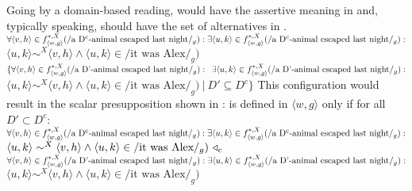 Going by a domain-based reading,  would have the assertive meaning in  and, typically speaking, should have the set of alternatives in .
\pex
\a {}\\$\forall{\langle v,h\rangle\in f^{*,X}_{\langle w,g\rangle}(/\text{a D\textsuperscript{c}-animal escaped last night}/_g)}:\\\exists\langle u,k\rangle\in f^{*,X}_{\langle w,g\rangle}(/\text{a D\textsuperscript{c}-animal escaped last night}/_g):$\\\emptyfill$\langle u,k\rangle\sim^X\langle v,h\rangle\land\langle u,k\rangle\in/\text{it was Alex}/_g)$
\a {}\\$\{\forall{\langle v,h\rangle\in f^{*,X}_{\langle w,g\rangle}(/\text{a D'-animal escaped last night}/_g)}:\\\phantom{\{}\exists\langle u,k\rangle\in f^{*,X}_{\langle w,g\rangle}(/\text{a D'-animal escaped last night}/_g):$\\\emptyfill$\langle u,k\rangle\sim^X\langle v,h\rangle\land\langle u,k\rangle\in/\text{it was Alex}/_g)~|~D'\subseteq D^c\}$
\xe
This configuration would result in the scalar presupposition shown in :
\ex
{}\linebreak
is defined in $\langle w,g\rangle$ only if for all $D'\subset D^c$:\\
$\forall{\langle v,h\rangle\in f^{*,X}_{\langle w,g\rangle}(/\text{a D\textsuperscript{c}-animal escaped last night}/_g)}:\\\exists\langle u,k\rangle\in f^{*,X}_{\langle w,g\rangle}(/\text{a D\textsuperscript{c}-animal escaped last night}/_g):$\\\emptyfill$\langle u,k\rangle\sim^X\langle v,h\rangle\land\langle u,k\rangle\in/\text{it was Alex}/_g)~\triangleleft_c$\\
$\forall{\langle v,h\rangle\in f^{*,X}_{\langle w,g\rangle}(/\text{a D'-animal escaped last night}/_g)}:\\\exists\langle u,k\rangle\in f^{*,X}_{\langle w,g\rangle}(/\text{a D'-animal escaped last night}/_g):$\\\emptyfill$\langle u,k\rangle\sim^X\langle v,h\rangle\land\langle u,k\rangle\in/\text{it was Alex}/_g)$
